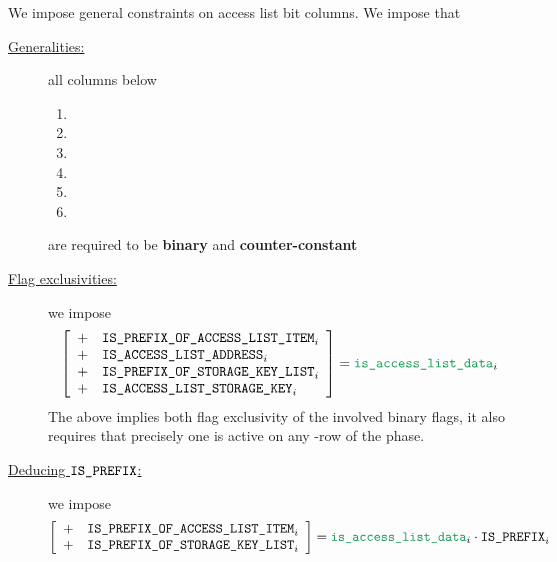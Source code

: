 We impose general constraints on access list bit columns.
We impose that
\begin{description}
    \item[\underline{Generalities:}]
	all columns below
	\begin{multicols}{2}
	    \begin{enumerate}
		\item \rlpTxnSharedColumnIsPrefix
		\item \rlpTxnSharedColumnIsPrefixOfAccessListItem
		\item \rlpTxnSharedColumnIsPrefixOfStorageKeyList
		\item[\vspace{\fill}]
		\item \rlpTxnSharedColumnIsAccessListAddress
		\item \rlpTxnSharedColumnIsAccessListStorageKey
	    \end{enumerate}
	\end{multicols}
	are required to be \textbf{binary} and \textbf{counter-constant}
    \item[\underline{Flag exclusivities:}]
	we impose
	\[
	    \left[ \begin{array}{cl}
		+ & \rlpTxnSharedColumnIsPrefixOfAccessListItem _{i} \\
		+ & \rlpTxnSharedColumnIsAccessListAddress      _{i} \\
		+ & \rlpTxnSharedColumnIsPrefixOfStorageKeyList _{i} \\
		+ & \rlpTxnSharedColumnIsAccessListStorageKey   _{i} \\
	    \end{array} \right]
	    = \locAccessListData _{i}
	\]
	\saNote{}
	The above implies both flag exclusivity of the involved binary flags,
	it also requires that precisely one is active on any \locAccessListData{}-row
	of the \phaseAccessList{} phase.
    \item[\underline{Deducing $\texttt{\texttt{IS\_PREFIX}}$:}]
	we impose
	\[
	    \left[ \begin{array}{cl}
		+ & \rlpTxnSharedColumnIsPrefixOfAccessListItem _{i} \\
		+ & \rlpTxnSharedColumnIsPrefixOfStorageKeyList _{i} \\
	    \end{array} \right]
	    = \locAccessListData _{i}
	    \cdot
	    \rlpTxnSharedColumnIsPrefix _{i}
	\]
\end{description}
